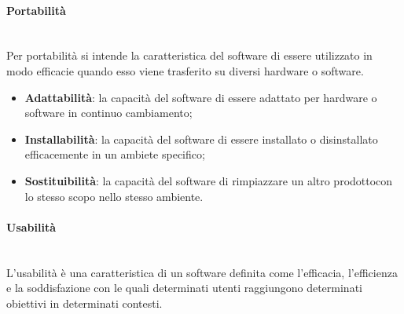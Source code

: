 	\paragraph{Portabilità} \mbox{}\\ 
	Per portabilità si intende la caratteristica del software di essere utilizzato in modo efficacie quando esso viene trasferito su diversi hardware o software.
	\begin{itemize}
		\item \textbf{Adattabilità}: la capacità del software di essere adattato per hardware o software in continuo cambiamento;
		\item \textbf{Installabilità}: la capacità del software di essere installato o disinstallato efficacemente in un ambiete specifico;
		\item \textbf{Sostituibilità}: la capacità del software di rimpiazzare un altro prodotto\glosp con lo stesso scopo nello stesso ambiente.
	\end{itemize}

	\paragraph{Usabilità} \mbox{}\\[1mm]
	L'usabilità è una caratteristica di un software definita come l'efficacia, l'efficienza e la soddisfazione con le quali determinati utenti raggiungono determinati obiettivi in determinati contesti.
